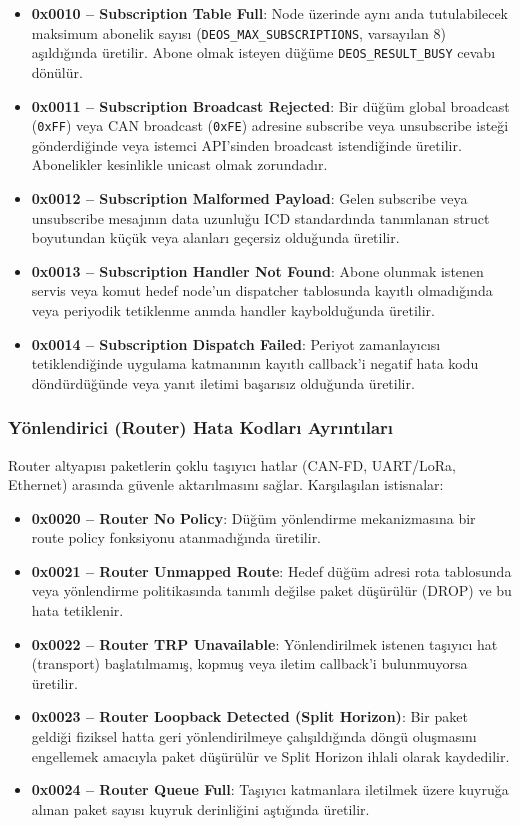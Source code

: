 \documentclass[a4paper,11pt]{article}
\newcommand{\hex}[1]{\texttt{0x#1}}
\begin{document}
\begin{itemize}
    \item \textbf{0x0010 -- Subscription Table Full}: Node üzerinde aynı anda tutulabilecek maksimum abonelik sayısı (\texttt{DEOS\_MAX\_SUBSCRIPTIONS}, varsayılan 8) aşıldığında üretilir. Abone olmak isteyen düğüme \texttt{DEOS\_RESULT\_BUSY} cevabı dönülür.
    \item \textbf{0x0011 -- Subscription Broadcast Rejected}: Bir düğüm global broadcast (\hex{FF}) veya CAN broadcast (\hex{FE}) adresine subscribe veya unsubscribe isteği gönderdiğinde veya istemci API'sinden broadcast istendiğinde üretilir. Abonelikler kesinlikle unicast olmak zorundadır.
    \item \textbf{0x0012 -- Subscription Malformed Payload}: Gelen subscribe veya unsubscribe mesajının data uzunluğu ICD standardında tanımlanan struct boyutundan küçük veya alanları geçersiz olduğunda üretilir.
    \item \textbf{0x0013 -- Subscription Handler Not Found}: Abone olunmak istenen servis veya komut hedef node'un dispatcher tablosunda kayıtlı olmadığında veya periyodik tetiklenme anında handler kaybolduğunda üretilir.
    \item \textbf{0x0014 -- Subscription Dispatch Failed}: Periyot zamanlayıcısı tetiklendiğinde uygulama katmanının kayıtlı callback'i negatif hata kodu döndürdüğünde veya yanıt iletimi başarısız olduğunda üretilir.
\end{itemize}

\subsubsection{Yönlendirici (Router) Hata Kodları Ayrıntıları}

Router altyapısı paketlerin çoklu taşıyıcı hatlar (CAN-FD, UART/LoRa, Ethernet) arasında güvenle aktarılmasını sağlar. Karşılaşılan istisnalar:

\begin{itemize}
    \item \textbf{0x0020 -- Router No Policy}: Düğüm yönlendirme mekanizmasına bir route policy fonksiyonu atanmadığında üretilir.
    \item \textbf{0x0021 -- Router Unmapped Route}: Hedef düğüm adresi rota tablosunda veya yönlendirme politikasında tanımlı değilse paket düşürülür (DROP) ve bu hata tetiklenir.
    \item \textbf{0x0022 -- Router TRP Unavailable}: Yönlendirilmek istenen taşıyıcı hat (transport) başlatılmamış, kopmuş veya iletim callback'i bulunmuyorsa üretilir.
    \item \textbf{0x0023 -- Router Loopback Detected (Split Horizon)}: Bir paket geldiği fiziksel hatta geri yönlendirilmeye çalışıldığında döngü oluşmasını engellemek amacıyla paket düşürülür ve Split Horizon ihlali olarak kaydedilir.
    \item \textbf{0x0024 -- Router Queue Full}: Taşıyıcı katmanlara iletilmek üzere kuyruğa alınan paket sayısı kuyruk derinliğini aştığında üretilir.
\end{itemize}
\end{document}

